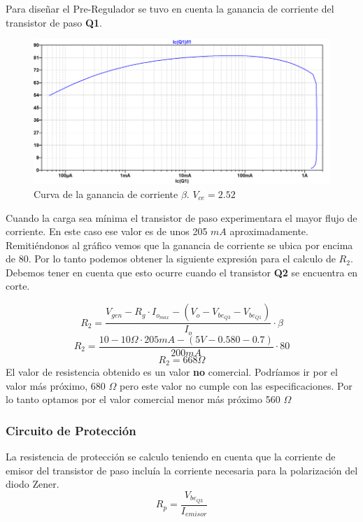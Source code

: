 Para diseñar el Pre-Regulador se tuvo en cuenta la ganancia de corriente del transistor de paso \textbf{Q1}.
\begin{figure}[H]
	\centering
	\includegraphics[width=0.7\linewidth]{ImagenesEjercicio1/BetaTPasoFV}
	\caption{Curva de la ganancia de corriente $\beta$. $V_{ce}=2.52$}
	\label{fig:betatpasofv}
\end{figure}
Cuando la carga sea mínima el transistor de paso experimentara el mayor flujo de corriente. En este caso ese valor es de unos 205 $mA$ aproximadamente. Remitiéndonos al gráfico vemos que la ganancia de corriente se ubica por encima de 80. 
Por lo tanto podemos obtener la siguiente expresión para el calculo de $R_2$. Debemos tener en cuenta que esto ocurre cuando el transistor \textbf{Q2} se encuentra en corte.

\begin{equation}
R_{2} = \frac{V_{gen}-R_{g}\cdot I_{o_{max}} - (V_o - V_{be_{Q3}} - V_{be_{Q1}}  )}{I_o} \cdot \beta
\end{equation}
\begin{equation}
R_{2} = \frac{10 - 10 \Omega \cdot 205mA - (5V - 0.580 -0.7)  }{200mA} \cdot 80
\end{equation}
\begin{equation}
R_{2} = 668 \Omega
\end{equation}
El valor de resistencia obtenido es un valor \textbf{no} comercial. Podríamos ir por el valor más próximo, 680 $\Omega$ pero este valor no cumple con las especificaciones. Por lo tanto optamos por el valor comercial menor más próximo 560 $\Omega$
\subsubsection{Circuito de Protección}
La resistencia de protección se calculo teniendo en cuenta que la corriente de emisor del transistor de paso incluía la corriente necesaria para la polarización del diodo Zener. 
\begin{equation}
	R_p = \frac{V_{be_{Q3}}}{I_{emisor}}
\end{equation}

